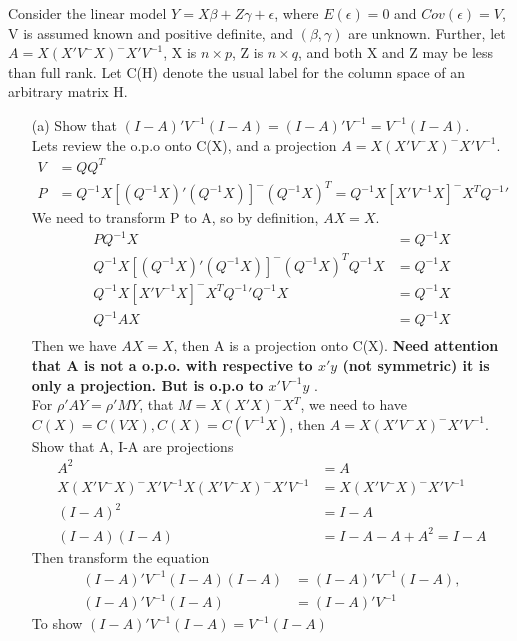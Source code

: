 Consider the linear model $Y = X\beta + Z\gamma + \epsilon$, where $E(\epsilon) = 0$ and $Cov(\epsilon) = V$, V is assumed known and positive definite, and $(\beta, \gamma)$ are unknown. Further, let $A =X(X'V^-X)^-X'V^{-1}$, X is $n \times p$, Z is $n \times q$, and both X and Z may be less than full rank. Let C(H) denote the usual label for the column space of an arbitrary matrix H.
\begin{itemize}
    \item [(a)] Show that $(I-A)'V^{-1}(I-A) = (I-A)'V^{-1} = V^{-1}(I-A)$. \\
    Lets review the o.p.o onto C(X), and a projection $A =X(X'V^-X)^-X'V^{-1}$.
\begin{align*}
 V &= QQ^{T}\\
 P &= Q^{-1}X [(Q^{-1}X)' (Q^{-1}X)]^{-} (Q^{-1}X)^{T} = Q^{-1}X [X' V^{-1}X]^- X^{T} Q^{-1} '
\end{align*}     
We need to transform P to A, so by definition, $AX = X$. 
\begin{align*}
 P Q^{-1}X &= Q^{-1}X \\
 Q^{-1}X [(Q^{-1}X)' (Q^{-1}X)]^{-} (Q^{-1}X)^{T} Q^{-1}X &= Q^{-1}X\\
 Q^{-1}X [X' V^{-1}X]^{-} X^T Q^{-1}'Q^{-1}X &= Q^{-1}X\\
 Q^{-1} A X &= Q^{-1}X\\
\end{align*}  
Then we have $AX = X$, then A is a projection onto C(X). \textbf{Need attention that A is not a o.p.o. with respective to $x'y$ (not symmetric) it is only a projection. But is o.p.o to $x' V^{-1}y$ }.\\
For $\rho'A Y = \rho' MY$, that $M= X(X'X)^{-} X^{T}$, we need to have $C(X) = C(VX), C(X) = C(V^{-1}X)$, then $A =X(X'V^-X)^-X'V^{-1}$.\\
Show that A, I-A are projections
\begin{align*}
A^2 &= A\\
X(X'V^-X)^-X'V^{-1} X(X'V^-X)^-X'V^{-1} &= X(X'V^-X)^-X'V^{-1}\\
(I-A)^2 &= I-A \\
(I-A)(I-A) &= I-A-A + A^2 = I-A
\end{align*}  
Then transform the equation
\begin{align*}
(I-A)'V^{-1}(I-A)(I-A) &= (I-A)'V^{-1}(I-A), \\
(I-A)'V^{-1}(I-A) &= (I-A)'V^{-1} 
\end{align*} 
To show $(I-A)'V^{-1}(I-A) = V^{-1}(I-A)$
\begin{align*}

\end{align*}
\end{itemize}
